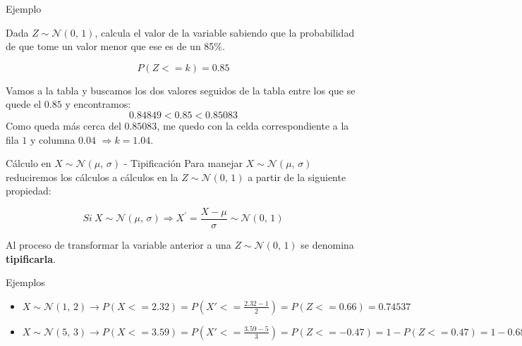 \documentclass[11pt]{beamer}
\begin{document}
\begin{frame}{Ejemplo}

Dada $Z \sim \mathcal{N}(0,\,1)$, calcula el valor de la variable sabiendo que la probabilidad de que tome un valor menor que ese es de un 85\%. 

$$P(Z<=k)=0.85$$
    \begin{center}
        
    \end{center}

Vamos a la tabla y buscamos los dos valores seguidos de la tabla entre los que se quede el $0.85$ y encontramos:
$$0.84849 < 0.85 < 0.85083 $$
Como queda más cerca del $0.85083$, me quedo con la celda correspondiente a la fila $1$ y columna $0.04$  $\Rightarrow k=1.04$.
\end{frame}

\begin{frame}{Cálculo en $X \sim \mathcal{N}(\mu,\,\sigma)$ - Tipificación}
Para manejar $X \sim \mathcal{N}(\mu,\,\sigma)$ reduciremos los cálculos a cálculos en la $Z \sim \mathcal{N}(0,\,1)$ a partir de la siguiente propiedad:

\begin{block}{}
$$ Si \  X \sim \mathcal{N}(\mu,\,\sigma) \Rightarrow X^{'}=\frac{X - \mu}{\sigma} \sim \mathcal{N}(0,\,1) $$
\end{block}

\pause

Al proceso de transformar la variable anterior a una $Z\sim \mathcal{N}(0,\,1)$ se denomina \textbf{tipificarla}.


\end{frame}



\begin{frame}{Ejemplos}

\begin{itemize}[<+->]
    \item $X \sim \mathcal{N}(1,\,2) \to P(X<=2.32)=P(X'<=\frac{2.32-1}{2})=P(Z<=0.66)=0.74537$
    \item $X \sim \mathcal{N}(5,\,3) \to P(X<=3.59)=P(X'<=\frac{3.59-5}{3})=P(Z<=-0.47)=1-P(Z<=0.47)=1-0.68082=0.31918$
\end{itemize}
\end{frame}
\end{document}

